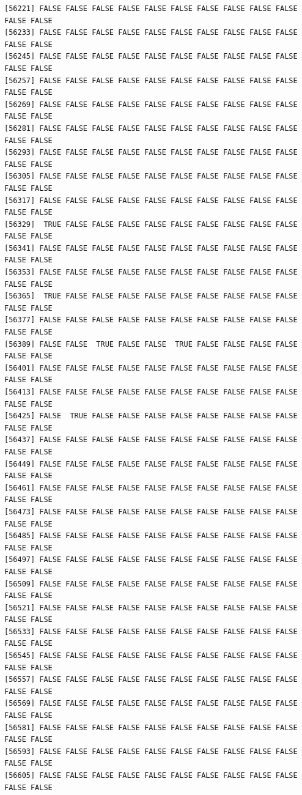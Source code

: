 \documentclass[
  a4paper,
  DIV=11,
  numbers=noendperiod]{scrartcl}
\begin{document}
\begin{verbatim}
[56221] FALSE FALSE FALSE FALSE FALSE FALSE FALSE FALSE FALSE FALSE FALSE FALSE
[56233] FALSE FALSE FALSE FALSE FALSE FALSE FALSE FALSE FALSE FALSE FALSE FALSE
[56245] FALSE FALSE FALSE FALSE FALSE FALSE FALSE FALSE FALSE FALSE FALSE FALSE
[56257] FALSE FALSE FALSE FALSE FALSE FALSE FALSE FALSE FALSE FALSE FALSE FALSE
[56269] FALSE FALSE FALSE FALSE FALSE FALSE FALSE FALSE FALSE FALSE FALSE FALSE
[56281] FALSE FALSE FALSE FALSE FALSE FALSE FALSE FALSE FALSE FALSE FALSE FALSE
[56293] FALSE FALSE FALSE FALSE FALSE FALSE FALSE FALSE FALSE FALSE FALSE FALSE
[56305] FALSE FALSE FALSE FALSE FALSE FALSE FALSE FALSE FALSE FALSE FALSE FALSE
[56317] FALSE FALSE FALSE FALSE FALSE FALSE FALSE FALSE FALSE FALSE FALSE FALSE
[56329]  TRUE FALSE FALSE FALSE FALSE FALSE FALSE FALSE FALSE FALSE FALSE FALSE
[56341] FALSE FALSE FALSE FALSE FALSE FALSE FALSE FALSE FALSE FALSE FALSE FALSE
[56353] FALSE FALSE FALSE FALSE FALSE FALSE FALSE FALSE FALSE FALSE FALSE FALSE
[56365]  TRUE FALSE FALSE FALSE FALSE FALSE FALSE FALSE FALSE FALSE FALSE FALSE
[56377] FALSE FALSE FALSE FALSE FALSE FALSE FALSE FALSE FALSE FALSE FALSE FALSE
[56389] FALSE FALSE  TRUE FALSE FALSE  TRUE FALSE FALSE FALSE FALSE FALSE FALSE
[56401] FALSE FALSE FALSE FALSE FALSE FALSE FALSE FALSE FALSE FALSE FALSE FALSE
[56413] FALSE FALSE FALSE FALSE FALSE FALSE FALSE FALSE FALSE FALSE FALSE FALSE
[56425] FALSE  TRUE FALSE FALSE FALSE FALSE FALSE FALSE FALSE FALSE FALSE FALSE
[56437] FALSE FALSE FALSE FALSE FALSE FALSE FALSE FALSE FALSE FALSE FALSE FALSE
[56449] FALSE FALSE FALSE FALSE FALSE FALSE FALSE FALSE FALSE FALSE FALSE FALSE
[56461] FALSE FALSE FALSE FALSE FALSE FALSE FALSE FALSE FALSE FALSE FALSE FALSE
[56473] FALSE FALSE FALSE FALSE FALSE FALSE FALSE FALSE FALSE FALSE FALSE FALSE
[56485] FALSE FALSE FALSE FALSE FALSE FALSE FALSE FALSE FALSE FALSE FALSE FALSE
[56497] FALSE FALSE FALSE FALSE FALSE FALSE FALSE FALSE FALSE FALSE FALSE FALSE
[56509] FALSE FALSE FALSE FALSE FALSE FALSE FALSE FALSE FALSE FALSE FALSE FALSE
[56521] FALSE FALSE FALSE FALSE FALSE FALSE FALSE FALSE FALSE FALSE FALSE FALSE
[56533] FALSE FALSE FALSE FALSE FALSE FALSE FALSE FALSE FALSE FALSE FALSE FALSE
[56545] FALSE FALSE FALSE FALSE FALSE FALSE FALSE FALSE FALSE FALSE FALSE FALSE
[56557] FALSE FALSE FALSE FALSE FALSE FALSE FALSE FALSE FALSE FALSE FALSE FALSE
[56569] FALSE FALSE FALSE FALSE FALSE FALSE FALSE FALSE FALSE FALSE FALSE FALSE
[56581] FALSE FALSE FALSE FALSE FALSE FALSE FALSE FALSE FALSE FALSE FALSE FALSE
[56593] FALSE FALSE FALSE FALSE FALSE FALSE FALSE FALSE FALSE FALSE FALSE FALSE
[56605] FALSE FALSE FALSE FALSE FALSE FALSE FALSE FALSE FALSE FALSE FALSE FALSE

\end{verbatim}
\end{document}
